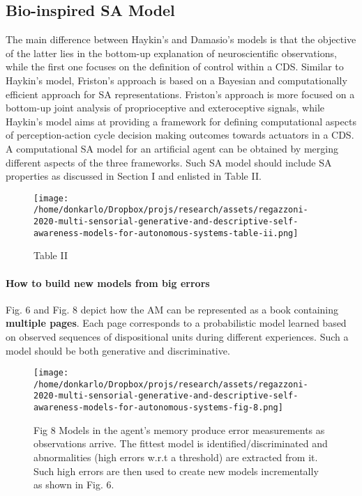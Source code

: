 \documentclass{article}
\begin{document}
		\subsection{Bio-inspired SA Model}
		The main difference between Haykin’s and Damasio’s models is that the objective of the latter lies in the bottom-up
		explanation of neuroscientific observations, while the first one
		focuses on the definition of control within a CDS. Similar
		to Haykin’s model, Friston’s approach is based on a Bayesian
		and computationally efficient approach for SA representations.
		Friston’s approach is more focused on a bottom-up joint analysis of proprioceptive and exteroceptive signals, while Haykin’s
		model aims at providing a framework for defining computational aspects of perception-action cycle decision making
		outcomes towards actuators in a CDS. A computational SA
		model for an artificial agent can be obtained by merging
		different aspects of the three frameworks. Such SA model
		should include SA properties as discussed in Section I and
		enlisted in \cite{regazzoni-2020-multi-sensorial-generative-and-descriptive-self-awareness-models-for-autonomous-systems}Table II.
		\begin{figure*}
			\centering
			\texttt{[image: /home/donkarlo/Dropbox/projs/research/assets/regazzoni-2020-multi-sensorial-generative-and-descriptive-self-awareness-models-for-autonomous-systems-table-ii.png]}
			\caption{\cite{regazzoni-2020-multi-sensorial-generative-and-descriptive-self-awareness-models-for-autonomous-systems} Table II}
			\label{fig:regazzoni-2020-multi-sensorial-generative-and-descriptive-self-awareness-models-for-autonomous-systems-table-ii.png}
		\end{figure*}
		\paragraph{How to build new models from big errors}
		\citet{regazzoni-2020-multi-sensorial-generative-and-descriptive-self-awareness-models-for-autonomous-systems} Fig. 6 and Fig. \citet{regazzoni-2020-multi-sensorial-generative-and-descriptive-self-awareness-models-for-autonomous-systems} 8 depict how the AM can be represented as
		a book containing \textbf{multiple pages}. Each page corresponds to
		a probabilistic model learned based on observed sequences of
		dispositional units during different experiences. Such a model
		should be both generative and discriminative. 
		\begin{figure*}
			\centering
			\texttt{[image: /home/donkarlo/Dropbox/projs/research/assets/regazzoni-2020-multi-sensorial-generative-and-descriptive-self-awareness-models-for-autonomous-systems-fig-8.png]}
			\caption{\cite{regazzoni-2020-multi-sensorial-generative-and-descriptive-self-awareness-models-for-autonomous-systems} Fig 8 Models in the agent’s memory produce error measurements as observations arrive. The fittest model is identified/discriminated and abnormalities (high errors w.r.t a
				threshold) are extracted from it. Such high errors are then	used to create new models incrementally as shown in Fig. 6.
			}
			\label{fig:regazzoni-2020-multi-sensorial-generative-and-descriptive-self-awareness-models-for-autonomous-systems-fig-8.png}
		\end{figure*}	
\end{document}
